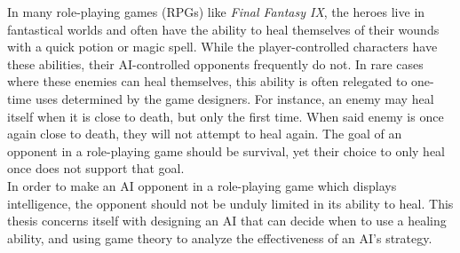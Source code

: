 In many role-playing games (RPGs) like \textit{Final Fantasy IX}, the heroes live in fantastical worlds and often have the ability to heal themselves of their wounds with a quick potion or magic spell. While the player-controlled characters have these abilities, their AI-controlled opponents frequently do not. In rare cases where these enemies can heal themselves, this ability is often relegated to one-time uses determined by the game designers. For instance, an enemy may heal itself when it is close to death, but only the first time. When said enemy is once again close to death, they will not attempt to heal again. The goal of an opponent in a role-playing game should be survival, yet their choice to only heal once does not support that goal.\\

In order to make an AI opponent in a role-playing game which displays intelligence, the opponent should not be unduly limited in its ability to heal. This thesis concerns itself with designing an AI that can decide when to use a healing ability, and using game theory to analyze the effectiveness of an AI's strategy.